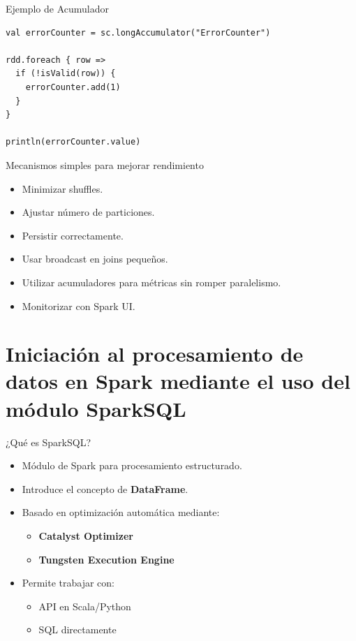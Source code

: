 \documentclass{beamer}
\begin{document}
\begin{frame}[fragile]{Ejemplo de Acumulador}
\begin{verbatim}
val errorCounter = sc.longAccumulator("ErrorCounter")

rdd.foreach { row =>
  if (!isValid(row)) {
    errorCounter.add(1)
  }
}

println(errorCounter.value)
\end{verbatim}
\end{frame}

\begin{frame}{Mecanismos simples para mejorar rendimiento}
\begin{itemize}
  \item Minimizar shuffles.
  \item Ajustar número de particiones.
  \item Persistir correctamente.
  \item Usar broadcast en joins pequeños.
  \item Utilizar acumuladores para métricas sin romper paralelismo.
  \item Monitorizar con Spark UI.
\end{itemize}
\end{frame}

\section{Iniciación al procesamiento de datos en Spark mediante el uso del módulo SparkSQL}

\begin{frame}{¿Qué es SparkSQL?}
\begin{itemize}
  \item Módulo de Spark para procesamiento estructurado.
  \item Introduce el concepto de \textbf{DataFrame}.
  \item Basado en optimización automática mediante:
  \begin{itemize}
    \item \textbf{Catalyst Optimizer}
    \item \textbf{Tungsten Execution Engine}
  \end{itemize}
  \item Permite trabajar con:
  \begin{itemize}
    \item API en Scala/Python
    \item SQL directamente
  \end{itemize}
\end{itemize}
\end{frame}
\end{document}
